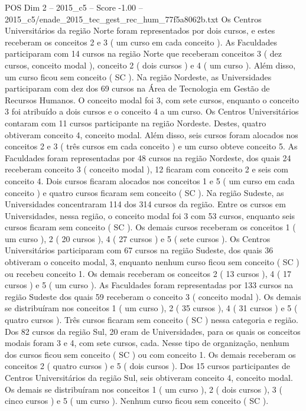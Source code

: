 \begin{textsample}{POS Dim 2 – 2015\_c5 – Score -1.00 – 2015\_c5/enade\_2015\_tec\_gest\_rec\_hum\_77f5a8062b.txt}
Os Centros Universitários da região Norte foram representados por dois cursos, e estes receberam os conceitos 2 e 3 ( um curso em cada conceito ).
As Faculdades participaram com 14 cursos na região Norte que receberam conceitos 3 ( dez cursos, conceito modal ), conceito 2 ( dois cursos ) e 4 ( um curso ).
Além disso, um curso ficou sem conceito ( SC ).
Na região Nordeste, as Universidades participaram com dez dos 69 cursos na Área de Tecnologia em Gestão de Recursos Humanos.
O conceito modal foi 3, com sete cursos, enquanto o conceito 3 foi atribuído a dois cursos e o conceito 4 a um curso.
Os Centros Universitários contaram com 11 cursos participante na região Nordeste.
Destes, quatro obtiveram conceito 4, conceito modal.
Além disso, seis cursos foram alocados nos conceitos 2 e 3 ( três cursos em cada conceito ) e um curso obteve conceito 5.
As Faculdades foram representadas por 48 cursos na região Nordeste, dos quais 24 receberam conceito 3 ( conceito modal ), 12 ficaram com conceito 2 e seis com conceito 4.
Dois cursos ficaram alocados nos conceitos 1 e 5 ( um curso em cada conceito ) e quatro cursos ficaram sem conceito ( SC ).
Na região Sudeste, as Universidades concentraram 114 dos 314 cursos da região.
Entre os cursos em Universidades, nessa região, o conceito modal foi 3 com 53 cursos, enquanto seis cursos ficaram sem conceito ( SC ).
Os demais cursos receberam os conceitos 1 ( um curso ), 2 ( 20 cursos ), 4 ( 27 cursos ) e 5 ( sete cursos ).
Os Centros Universitários participaram com 67 cursos na região Sudeste, dos quais 36 obtiveram o conceito modal, 3, enquanto nenhum curso ficou sem conceito ( SC ) ou recebeu conceito 1.
Os demais receberam os conceitos 2 ( 13 cursos ), 4 ( 17 cursos ) e 5 ( um curso ).
As Faculdades foram representadas por 133 cursos na região Sudeste dos quais 59 receberam o conceito 3 ( conceito modal ).
Os demais se distribuíram nos conceitos 1 ( um curso ), 2 ( 35 cursos ), 4 ( 31 cursos ) e 5 ( quatro cursos ).
Três cursos ficaram sem conceito ( SC ) nessa categoria e região.
Dos 82 cursos da região Sul, 20 eram de Universidades, para os quais os conceitos modais foram 3 e 4, com sete cursos, cada.
Nesse tipo de organização, nenhum dos cursos ficou sem conceito ( SC ) ou com conceito 1.
Os demais receberam os conceitos 2 ( quatro cursos ) e 5 ( dois cursos ).
Dos 15 cursos participantes de Centros Universitários da região Sul, seis obtiveram conceito 4, conceito modal.
Os demais se distribuíram nos conceitos 1 ( um curso ), 2 ( dois cursos ), 3 ( cinco cursos ) e 5 ( um curso ).
Nenhum curso ficou sem conceito ( SC ).

\end{textsample}
